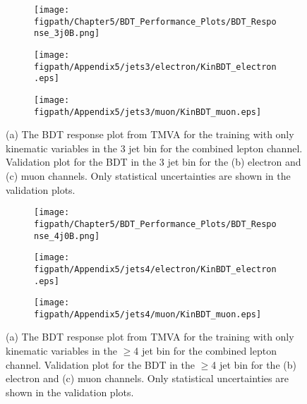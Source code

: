 \begin{figure}[!hbt]
    \centering
    \begin{subfigure}[t]{0.317\textwidth}
        \texttt{[image: \\figpath/Chapter5/BDT\_Performance\_Plots/BDT\_Response\_3j0B.png]}
        \caption{}
        \label{fig:BDT_Response_3j0B_TMVA}
    \end{subfigure}
    \begin{subfigure}[t]{0.317\textwidth}
        \texttt{[image: \\figpath/Appendix5/jets3/electron/KinBDT\_electron.eps]}
        \caption{}
        \label{fig:KinBDT_jets3_electron_noSys}
    \end{subfigure}
    \begin{subfigure}[t]{0.317\textwidth}
        \texttt{[image: \\figpath/Appendix5/jets3/muon/KinBDT\_muon.eps]}
        \caption{}
        \label{fig:KinBDT_jets3_muon_noSys}
    \end{subfigure}
    \caption{(a) The BDT response plot from TMVA for the training with only kinematic variables in the 3 jet bin for the combined lepton channel. Validation plot for the BDT in the 3 jet bin for the (b) electron and (c) muon channels. Only statistical uncertainties are shown in the validation plots.}
    \label{fig:KinBDT_Comparison_jets2}
\end{figure}

\begin{figure}[!hbt]
    \centering
    \begin{subfigure}[t]{0.317\textwidth}
        \texttt{[image: \\figpath/Chapter5/BDT\_Performance\_Plots/BDT\_Response\_4j0B.png]}
        \caption{}
        \label{fig:BDT_Response_4j0B_TMVA}
    \end{subfigure}
    \begin{subfigure}[t]{0.317\textwidth}
        \texttt{[image: \\figpath/Appendix5/jets4/electron/KinBDT\_electron.eps]}
        \caption{}
        \label{fig:KinBDT_jets4_electron_noSys}
    \end{subfigure}
    \begin{subfigure}[t]{0.317\textwidth}
        \texttt{[image: \\figpath/Appendix5/jets4/muon/KinBDT\_muon.eps]}
        \caption{}
        \label{fig:KinBDT_jets4_muon_noSys}
    \end{subfigure}
    \caption{(a) The BDT response plot from TMVA for the training with only kinematic variables in the $\geqslant$4 jet bin for the combined lepton channel. Validation plot for the BDT in the $\geqslant$4 jet bin for the (b) electron and (c) muon channels. Only statistical uncertainties are shown in the validation plots.}
    \label{fig:KinBDT_Comparison_jets2}
\end{figure}

